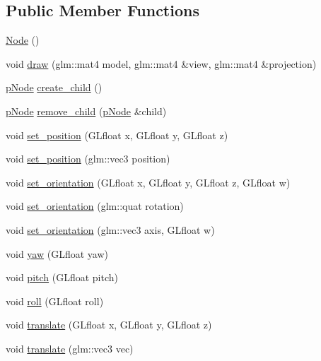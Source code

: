 \subsection*{Public Member Functions}
\begin{DoxyCompactItemize}
\item 
\hyperlink{classLarp_1_1Node_a2cb8fc6e60b762b02226d73489ac5099}{Node} ()
\item 
void \hyperlink{classLarp_1_1Node_aa701cc59976ddbd1c232e027df0e4a9b}{draw} (glm\+::mat4 model, glm\+::mat4 \&view, glm\+::mat4 \&projection)
\item 
\hyperlink{namespaceLarp_a57e9a3e29e68cdf508c964274d9ac1a4}{p\+Node} \hyperlink{classLarp_1_1Node_a8dac983fde585084afddddb2ab60c1d8}{create\+\_\+child} ()
\item 
\hyperlink{namespaceLarp_a57e9a3e29e68cdf508c964274d9ac1a4}{p\+Node} \hyperlink{classLarp_1_1Node_a800ecd41070c27d36e7971e55d3b9842}{remove\+\_\+child} (\hyperlink{namespaceLarp_a57e9a3e29e68cdf508c964274d9ac1a4}{p\+Node} \&child)
\item 
void \hyperlink{classLarp_1_1Node_a44070f7bb06cdca4fafbdf65f0d6118e}{set\+\_\+position} (G\+Lfloat x, G\+Lfloat y, G\+Lfloat z)
\item 
void \hyperlink{classLarp_1_1Node_a8eef7a9829817bfe9b2ff3bed5b0c3a8}{set\+\_\+position} (glm\+::vec3 position)
\item 
void \hyperlink{classLarp_1_1Node_ad1b12b56ba7c708d1ce51ec0762f7476}{set\+\_\+orientation} (G\+Lfloat x, G\+Lfloat y, G\+Lfloat z, G\+Lfloat w)
\item 
void \hyperlink{classLarp_1_1Node_a3695bdfa48908be007d751e9c05bdb0e}{set\+\_\+orientation} (glm\+::quat rotation)
\item 
void \hyperlink{classLarp_1_1Node_a0d5e761af674c2c547e8638b91a2a85b}{set\+\_\+orientation} (glm\+::vec3 axis, G\+Lfloat w)
\item 
void \hyperlink{classLarp_1_1Node_a829a3cf29a5f165f7d771cc283f25053}{yaw} (G\+Lfloat yaw)
\item 
void \hyperlink{classLarp_1_1Node_ad8f8390e764a96398d080538c437c7ee}{pitch} (G\+Lfloat pitch)
\item 
void \hyperlink{classLarp_1_1Node_a1c839a3075f1e97aa368ba8212c50ee7}{roll} (G\+Lfloat roll)
\item 
void \hyperlink{classLarp_1_1Node_aa0186c5d77b58e2d7ede02dec0f2cdc4}{translate} (G\+Lfloat x, G\+Lfloat y, G\+Lfloat z)
\item 
void \hyperlink{classLarp_1_1Node_a7494be4e04c8f5911aedeeb41c27993b}{translate} (glm\+::vec3 vec)

\end{DoxyCompactItemize}
